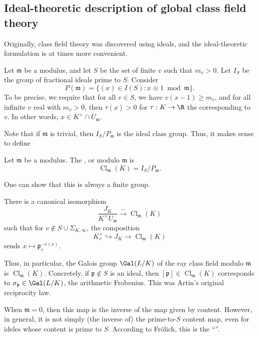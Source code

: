 \documentclass[a4paper]{article}
\DeclareMathOperator\Cl{\mathrm{Cl}}
\begin{document}
\subsection{Ideal-theoretic description of global class field theory}
Originally, class field theory was discovered using ideals, and the ideal-theoretic formulation is at times more convenient.

Let $\mathfrak{m}$ be a modulus, and let $S$ be the set of finite $v$ such that $m_v > 0$. Let $I_S$ be the group of fractional ideals prime to $S$. Consider
\[
  P(\mathfrak{m}) = \{(x) \in I(S): x \equiv 1 \bmod {\mathfrak{m}}\}.
\]
To be precise, we require that for all $v \in S$, we have $v(x - 1) \geq m_v$, and for all infinite $v$ real with $m_v > 0$, then $\tau(x) > 0$ for $\tau: K \to \R$ the corresponding to $v$. In other words, $x \in K^\times \cap U_\mathfrak{m}$.

Note that if $\mathfrak{m}$ is trivial, then $I_S/P_\mathfrak{m}$ is the ideal class group. Thus, it makes sense to define
\begin{defi}
  Let $\mathfrak{m}$ be a modulus. The , or  modulo $\mathfrak{m}$ is
  \[
    \Cl_\mathfrak{m}(K) = I_S/P_\mathfrak{m}.
  \]
\end{defi}
One can show that this is always a finite group.

\begin{prop}
  There is a canonical isomorphism
  \[
    \frac{J_K}{K^\times U_\mathfrak{m}} \overset{\sim}{\to} \Cl_\mathfrak{m}(K)
  \]
  such that for $v \not \in S\cup \Sigma_{K, \infty}$, the composition
  \[
    K_v^\times \hookrightarrow J_K \to \Cl_\mathfrak{m}(K)
  \]
  sends $x \mapsto \mathfrak{p}_v^{-v(x)}$.

  Thus, in particular, the Galois group $\Gal(L/K)$ of the ray class field modulo $\mathfrak{m}$ is $\Cl_\mathfrak{m}(K)$. Concretely, if $\mathfrak{p} \not \in S$ is an ideal, then $[\mathfrak{p}] \in \Cl_{\mathfrak{m}}(K)$ corresponds to $\sigma_\mathfrak{p} \in \Gal (L/K)$, the arithmetic Frobenius. This was Artin's original reciprocity law.
\end{prop}

When $\mathfrak{m} = 0$, then this map is the inverse of the map given by content. However, in general, it is not simply (the inverse of) the prime-to-$S$ content map, even for ideles whose content is prime to $S$. According to Fr\"olich, this is the ``''.
\end{document}
